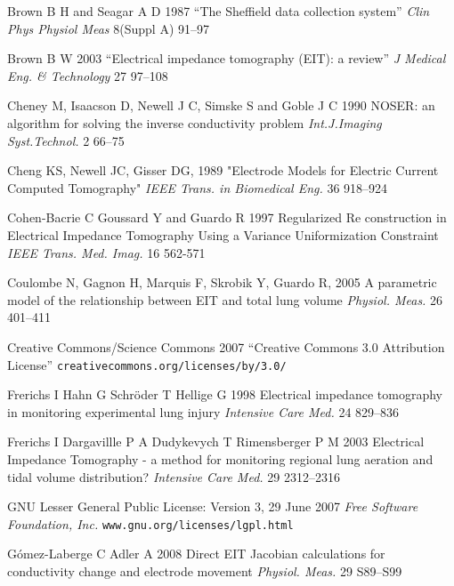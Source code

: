 \documentclass[12pt]{iopart}
\begin{document}
\item[]
Brown B H and Seagar A D 1987 
``The Sheffield data collection system''
{\em Clin Phys Physiol Meas}
 8(Suppl A) 91--97

\item[]
Brown B W 2003
``Electrical impedance tomography (EIT): a review''
{\em J Medical Eng. \& Technology}
27 97--108


\item[]
Cheney M, Isaacson D, Newell J C, Simske S and Goble J C 1990
NOSER: an algorithm for solving the inverse conductivity problem
{\em Int.J.Imaging Syst.Technol.} 
2 66--75

\item[]
Cheng KS, Newell JC, Gisser DG, 1989
"Electrode Models for Electric Current Computed Tomography"
{\em IEEE Trans. in Biomedical Eng.}
36 918--924


\item[]
Cohen-Bacrie C  Goussard Y and Guardo R
1997
Regularized Re construction in Electrical
Impedance Tomography Using a Variance
Uniformization Constraint 
{\em IEEE Trans. Med. Imag.} 16 562-571

\item[]
Coulombe N, Gagnon H, Marquis F, Skrobik Y, Guardo R, 2005
A parametric model of the relationship between EIT and total lung volume
{\em Physiol. Meas.}
26 401--411


\item[]
Creative Commons/Science Commons 2007
``Creative Commons 3.0 Attribution License''
\verb+creativecommons.org/licenses/by/3.0/+

\item[]
Frerichs I  Hahn G Schr\"oder T Hellige G 1998
Electrical impedance tomography in
monitoring experimental lung injury
{\em Intensive Care Med.}
24 829--836

\item[]
Frerichs I Dargavillle P A Dudykevych T Rimensberger P M 2003
Electrical Impedance Tomography - a method for monitoring
regional lung aeration and tidal volume distribution?
{\em  Intensive Care Med.}
29 2312--2316

\item[]
GNU Lesser General Public License: Version 3, 29 June 2007
{\em Free Software Foundation, Inc.}
\verb+www.gnu.org/licenses/lgpl.html+

G\'omez-Laberge C Adler A 2008
Direct EIT Jacobian calculations for conductivity change and electrode movement
{\em Physiol. Meas.}
29 S89--S99
\end{document}
